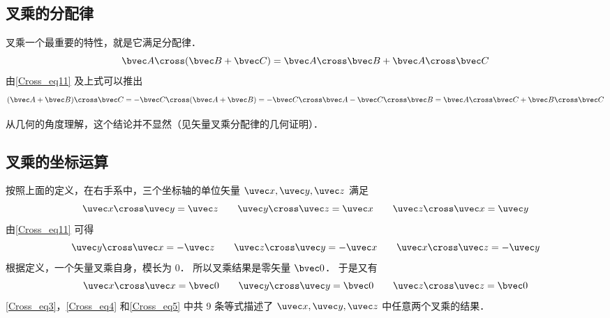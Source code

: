 \subsection{叉乘的分配律}

叉乘一个最重要的特性，就是它满足分配律．
\begin{equation}\label{Cross_eq6}
\bvec A \cross (\bvec B +\bvec C) = \bvec A \cross \bvec B + \bvec A \cross \bvec C
\end{equation}
由\autoref{Cross_eq11} 及上式可以推出
\begin{equation}\label{Cross_eq7}
(\bvec A + \bvec B) \cross \bvec C =  - \bvec C \cross (\bvec A + \bvec B) =  - \bvec C \cross \bvec A - \bvec C \cross \bvec B = \bvec A \cross \bvec C + \bvec B \cross \bvec C
\end{equation}

从几何的角度理解，这个结论并不显然（见矢量叉乘分配律的几何证明）．

\subsection{叉乘的坐标运算}

按照上面的定义，在右手系中，三个坐标轴的单位矢量 $\uvec x, \uvec y, \uvec z$ 满足
\begin{equation}\label{Cross_eq3}
\uvec x \cross \uvec y = \uvec z
\qquad
\uvec y \cross \uvec z = \uvec x
\qquad
\uvec z \cross \uvec x = \uvec y
\end{equation}
由\autoref{Cross_eq11} 可得
\begin{equation}\label{Cross_eq4}
\uvec y \cross \uvec x =  - \uvec z
\qquad
\uvec z \cross \uvec y =  - \uvec x
\qquad
\uvec x \cross \uvec z =  - \uvec y
\end{equation}
根据定义，一个矢量叉乘自身，模长为 $0$． 所以叉乘结果是零矢量 $\bvec 0$． 于是又有
\begin{equation}\label{Cross_eq5}
\uvec x \cross \uvec x = \bvec 0
\qquad
\uvec y \cross \uvec y = \bvec 0
\qquad
\uvec z \cross \uvec z = \bvec 0
\end{equation}
\autoref{Cross_eq3}，\autoref{Cross_eq4} 和\autoref{Cross_eq5} 中共 9 条等式描述了 $\uvec x, \uvec y, \uvec z$ 中任意两个叉乘的结果．



